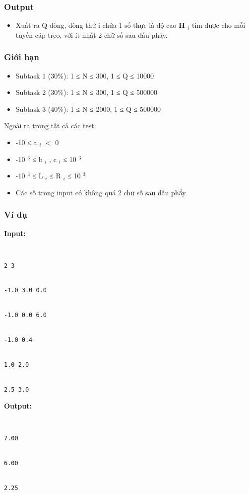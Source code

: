 \subsubsection{   Output  }
\begin{itemize}
	\item     Xuất ra Q dòng, dòng thứ i chứa 1 số thực là độ cao    \textbf{     H     $_      i     $}    tìm được cho mỗi tuyến cáp treo, với ít nhất 2 chữ số sau dấu phẩy.   
\end{itemize}

\subsubsection{   Giới hạn  }
\begin{itemize}
	\item     Subtask 1 (30\%): 1 ≤ N ≤ 300, 1 ≤ Q ≤ 10000   
	\item     Subtask 2 (30\%): 1 ≤ N ≤ 300, 1 ≤ Q ≤ 500000   
	\item     Subtask 3 (40\%): 1 ≤ N ≤ 2000, 1 ≤ Q ≤ 500000   
\end{itemize}

   Ngoài ra trong tất cả các test:  
\begin{itemize}
	\item     -10 ≤ a    $_     i    $    $<$ 0   
	\item     -10    $^     3    $    ≤ b    $_     i    $    , c    $_     i    $    ≤ 10    $^     3    $
	\item     -10    $^     3    $    ≤ L    $_     i    $    ≤ R    $_     i    $    ≤ 10    $^     3    $
	\item     Các số trong input có không quá 2 chữ số sau dấu phẩy   
\end{itemize}

\subsubsection{   Ví dụ  }

\textbf{    Input:   }
\begin{verbatim}


2 3


-1.0 3.0 0.0


-1.0 0.0 6.0


-1.0 0.4


1.0 2.0


2.5 3.0\end{verbatim}

\textbf{    Output:   }
\begin{verbatim}


7.00


6.00


2.25\end{verbatim}

